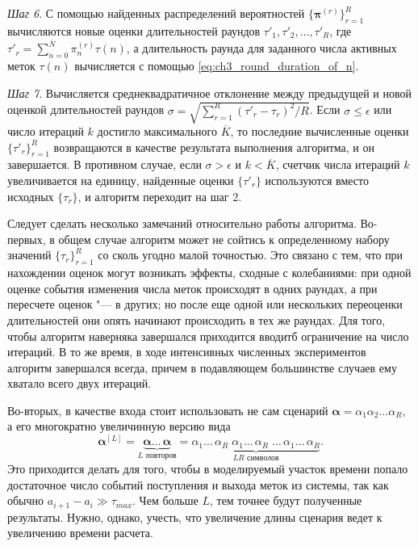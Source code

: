 \textit{Шаг 6}. С помощью найденных распределений вероятностей $\{ \bm{\pi}^{(r)} \}_{r=1}^R$ вычисляются новые оценки длительностей раундов $\tau'_1, \tau'_2, \dots, \tau'_R$, где $\tau'_r = \sum_{n=0}^{\overline{N}} \pi^{(r)}_n \tau(n)$, а длительность раунда для заданного числа активных меток $\tau(n)$ вычисляется с помощью \eqref{eq:ch3_round_duration_of_n}.

\textit{Шаг 7}. Вычисляется среднеквадратичное отклонение между предыдущей и новой оценкой длительностей раундов $\sigma = \sqrt{\sum_{r=1}^R (\tau'_r - \tau_r)^2 / R}$. Если $\sigma \leqslant \epsilon$ или число итераций $k$ достигло максимального $\overline{K}$, то последние вычисленные оценки $\{ \tau'_r \}_{r=1}^R$ возвращаются в качестве результата выполнения алгоритма, и он завершается. В противном случае, если $\sigma > \epsilon$ и $k < \overline{K}$, счетчик числа итераций $k$ увеличивается на единицу, найденные оценки $\{ \tau'_r \}$ используются вместо исходных $\{ \tau_r \}$, и алгоритм переходит на шаг 2.

Следует сделать несколько замечаний относительно работы алгоритма. Во-первых, в общем случае алгоритм может не сойтись к определенному набору значений $\{ \tau_r \}_{r=1}^R$ со сколь угодно малой точностью. Это связано с тем, что при нахождении оценок могут возникать эффекты, сходные с колебаниями: при одной оценке события изменения числа меток происходят в одних раундах, а при пересчете оценок "--- в других; но после еще одной или нескольких переоценки длительностей они опять начинают происходить в тех же раундах. Для того, чтобы алгоритм наверняка завершался приходится вводитб ограничение на число итераций. В то же время, в ходе интенсивных численных экспериментов алгоритм завершался всегда, причем в подавляющем большинстве случаев ему хватало всего двух итераций.

Во-вторых, в качестве входа стоит использовать не сам сценарий $\bm{\alpha} = \alpha_1 \alpha_2 \dots \alpha_R$, а его многократно увеличинную версию вида
$$
	\bm{\alpha}^{[L]} = \underbrace{\bm{\alpha} \dots\, \bm{\alpha}}_{L \text{ повторов}} =
		\underbrace{\alpha_1 \dots\, \alpha_R \; \alpha_1 \dots\, \alpha_R\; \dots \, \alpha_1 \dots\, \alpha_R}_{LR \text{ символов}}.
$$
Это приходится делать для того, чтобы в моделируемый участок времени попало достаточное число событий поступления и выхода меток из системы, так как обычно $a_{i+1} - a_i \gg \tau_{max}$. Чем больше $L$, тем точнее будут полученные результаты. Нужно, однако, учесть, что увеличение длины сценария ведет к увеличению времени расчета.

